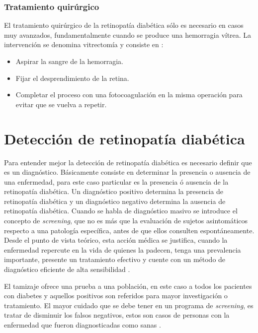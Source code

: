  \subsubsection{Tratamiento quirúrgico}
 El tratamiento quirúrgico de la retinopatía diabética sólo es necesario en casos muy avanzados, fundamentalmente cuando se produce una hemorragia vítrea. La intervención se denomina vitrectomía y consiste en \cite{manteca2012tratamiento}:
 \begin{itemize}
 \item Aspirar la sangre de la hemorragia. 
 \item Fijar el desprendimiento de la retina.
  \item Completar el proceso con una fotocoagulación en la misma operación para evitar que se vuelva a repetir.
 \end{itemize}
 
 



\section{Detección de retinopatía diabética}

Para entender mejor la detección de retinopatía diabética es necesario definir que es un diagnóstico. Básicamente consiste en determinar la presencia o ausencia de una enfermedad, para este caso particular es la  presencia ó ausencia de la retinopatía diabética. Un diagnóstico positivo determina la presencia de retinopatía diabética y un diagnóstico negativo determina la ausencia de retinopatía diabética.
Cuando se habla de diagnóstico masivo se introduce el concepto de \textit{screening}, que no es más que la evaluación  de sujetos asintomáticos respecto a una patología específica, antes de que ellos consulten espontáneamente. Desde el punto de vista teórico, esta acción médica se justifica, cuando la enfermedad repercute en la vida de quienes la padecen, tenga una prevalencia importante, presente un tratamiento efectivo y cuente con un método de diagnóstico eficiente de alta sensibilidad \cite{uk2003criteria,beaglehole1994epidemiologia}.

El tamizaje ofrece una prueba a una población, en este caso a todos los pacientes con diabetes y aquellos positivos son referidos para mayor investigación o tratamiento. 
El mayor cuidado que se debe tener en un programa de \textit{screening}, es tratar de disminuir los falsos negativos, estos son casos de personas con la enfermedad que fueron diagnosticadas como sanas \cite{von2011guia}.

